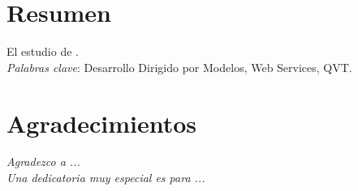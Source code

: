 \chapter*{Resumen}

El estudio de .\\

\emph{Palabras clave}: Desarrollo Dirigido por Modelos, Web Services, QVT.

\thispagestyle{empty} %

\chapter*{Agradecimientos}

{\sl Agradezco a ...}\\

{\sl Una dedicatoria muy especial es para ...}\\




